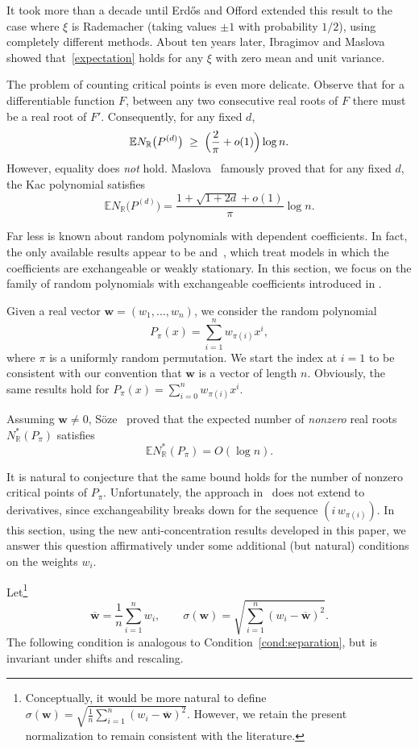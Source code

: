 \documentclass[reqno]{amsart}
\newcommand\R{{\mathbb{R}}}
\newcommand\E{{\mathbb{E}}}
\newcommand\BMw{{\bm w}}
\theoremstyle{plain}
\theoremstyle{definition}
\begin{document}
It took more than a decade until Erd\H{o}s and Offord extended this result to
the case where $\xi$ is Rademacher (taking values $\pm1$ with probability
$1/2$), using completely different methods. About ten years later,
Ibragimov and Maslova~\cite{IM} showed that~\eqref{expectation} holds for any
$\xi$ with zero mean and unit variance.

The problem of counting critical points is even more delicate. Observe that
for a differentiable function $F$, between any two consecutive real roots of
$F$ there must be a real root of $F'$. Consequently, for any fixed $d$,
\[
\E N_{\R}\bigl(P^{(d)}\bigr)
\;\ge\;
\Bigl(\frac{2}{\pi}+o(1)\Bigr)\log n .
\]
However, equality does \emph{not} hold. Maslova~\cite{Mas} famously proved that
for any fixed $d$, the Kac polynomial satisfies
\begin{equation}\label{eqn:critical}
\E N_{\R}\bigl(P^{(d)}\bigr)
=
\frac{1+\sqrt{1+2d}+o(1)}{\pi}\log n .
\end{equation}

Far less is known about random polynomials with dependent coefficients. In
fact, the only available results appear to be
\cite{Soze1,Soze2} and~\cite{ONg}, which treat models in which the coefficients
are exchangeable or weakly stationary. In this section, we focus on the family
of random polynomials with exchangeable coefficients introduced in
\cite{Soze1,Soze2}.

Given a real vector $\BMw=(w_1,\dots,w_n)$, we consider the random polynomial
\[
P_{\pi}(x)=\sum_{i=1}^n w_{\pi(i)} x^i,
\]
where $\pi$ is a uniformly random permutation. We start the index at $i=1$ to
be consistent with our convention that $\BMw$ is a vector of length $n$.
Obviously, the same results hold for
$P_{\pi}(x)=\sum_{i=0}^n w_{\pi(i)}x^i$.

Assuming $\BMw\neq0$, S{\"o}ze~\cite[Theorem~1]{Soze2} proved that the expected
number of \emph{nonzero} real roots $N_{\R}^\ast(P_{\pi})$ satisfies
\[
\E N_{\R}^\ast(P_{\pi})=O(\log n).
\]

It is natural to conjecture that the same bound holds for the number of
nonzero critical points of $P_{\pi}$. Unfortunately, the approach
in~\cite{Soze2} does not extend to derivatives, since exchangeability breaks
down for the sequence $(i\,w_{\pi(i)})$. In this section, using the new
anti-concentration results developed in this paper, we answer this question
affirmatively under some additional (but natural) conditions on the weights
$w_i$.

Let\footnote{Conceptually, it would be more natural to define
$\sigma(\BMw)=\sqrt{\frac{1}{n}\sum_{i=1}^n (w_i-\overline{\BMw})^2}$. However,
we retain the present normalization to remain consistent with the literature.}
\[
\overline{\BMw}=\frac{1}{n}\sum_{i=1}^n w_i,
\qquad
\sigma(\BMw)=\sqrt{\sum_{i=1}^n (w_i-\overline{\BMw})^2}.
\]
The following condition is analogous to Condition~\ref{cond:separation}, but
is invariant under shifts and rescaling.
\end{document}
